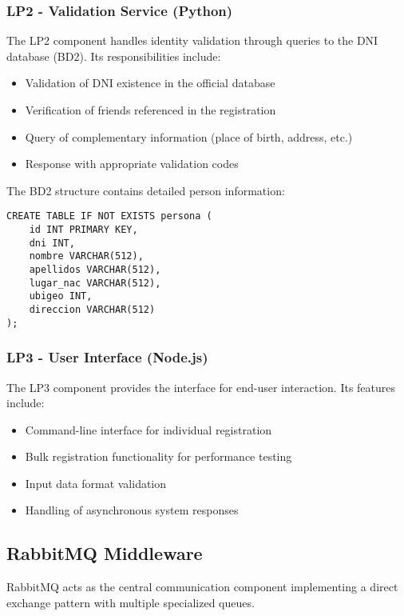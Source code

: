 \documentclass[10pt,a4paper]{article}
\theoremstyle{definition}
\theoremstyle{remark}
\begin{document}
\subsubsection{LP2 - Validation Service (Python)}
The LP2 component handles identity validation through queries to the DNI database (BD2). Its responsibilities include:

\begin{itemize}
    \item Validation of DNI existence in the official database
    \item Verification of friends referenced in the registration
    \item Query of complementary information (place of birth, address, etc.)
    \item Response with appropriate validation codes
\end{itemize}

The BD2 structure contains detailed person information:

\begin{lstlisting}[style=sqlstyle, caption={BD2 Structure - DNI Database}]
CREATE TABLE IF NOT EXISTS persona (
    id INT PRIMARY KEY,
    dni INT,
    nombre VARCHAR(512),
    apellidos VARCHAR(512),
    lugar_nac VARCHAR(512),
    ubigeo INT,
    direccion VARCHAR(512)
);
\end{lstlisting}

\subsubsection{LP3 - User Interface (Node.js)}
The LP3 component provides the interface for end-user interaction. Its features include:

\begin{itemize}
    \item Command-line interface for individual registration
    \item Bulk registration functionality for performance testing
    \item Input data format validation
    \item Handling of asynchronous system responses
\end{itemize}

\subsection{RabbitMQ Middleware}

RabbitMQ acts as the central communication component implementing a direct exchange pattern with multiple specialized queues.
\end{document}
